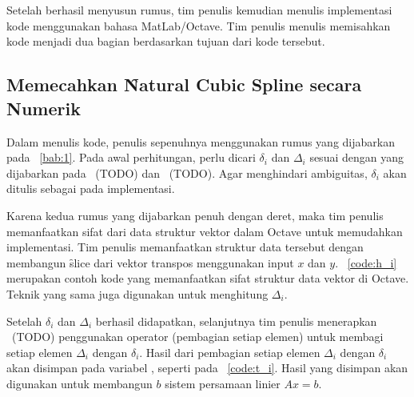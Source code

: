 \chapter{\babTiga}
\label{bab:3}
Setelah berhasil menyusun rumus, tim penulis kemudian menulis implementasi kode menggunakan
bahasa MatLab/Octave. Tim penulis menulis memisahkan kode menjadi dua bagian berdasarkan
tujuan dari kode tersebut.


\section{Memecahkan \f{Natural Cubic Spline} secara Numerik}
\label{sec:numericCubicSpline}
Dalam menulis kode, penulis sepenuhnya menggunakan rumus yang dijabarkan pada
\bab~\ref{bab:1}. Pada awal perhitungan, perlu dicari $\delta_i$ dan $\Delta_i$
sesuai dengan yang dijabarkan pada \equ~(TODO) dan \equ~(TODO). Agar menghindari
ambiguitas, $\delta_i$ akan ditulis sebagai  pada implementasi.

Karena kedua rumus yang dijabarkan penuh dengan deret, maka tim penulis
memanfaatkan sifat dari data struktur vektor dalam Octave untuk memudahkan
implementasi. Tim penulis memanfaatkan struktur data tersebut dengan membangun
\f{slice} dari vektor transpos menggunakan input $x$ dan $y$. \lst~\ref{code:h_i}
merupakan contoh kode yang memanfaatkan sifat struktur data vektor di Octave.
Teknik yang sama juga digunakan untuk menghitung $\Delta_i$.



Setelah $\delta_i$ dan $\Delta_i$ berhasil didapatkan, selanjutnya tim penulis
menerapkan \equ~(TODO) penggunakan operator  (pembagian setiap elemen)
untuk membagi setiap elemen $\Delta_i$ dengan $\delta_i$. Hasil dari pembagian
setiap elemen $\Delta_i$ dengan $\delta_i$ akan disimpan pada variabel ,
seperti pada \lst~\ref{code:t_i}. Hasil yang disimpan akan digunakan untuk
membangun $b$ sistem persamaan linier $A x = b$.



